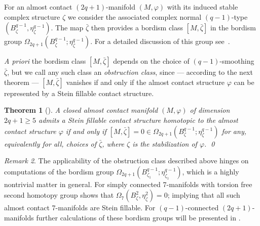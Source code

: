 \documentclass[12pt]{amsart}
\newcommand\acs{\varphi}  				%
\newcommand\scxs{\zeta}					%
\newcommand\bscxs{\bar \zeta}			%
\newtheorem{Theorem}{Theorem}[section]
\theoremstyle{remark}
\newtheorem{Remark}[Theorem]{Remark}
\begin{document}
For an almost contact $(2q{+}1)$-manifold $(M,\varphi )$ with its induced
stable complex structure $\zeta$ we consider the associated complex normal
$(q{-}1)$-type $(B^{q{-}1}_{\zeta}, \eta ^{q{-}1}_{\zeta})$.
The map $\bar \zeta$ then provides a bordism class $[M, \bar \zeta]$
in the bordism group $\Omega _{2q{+}1}(B^{q{-}1}_{\zeta}; \eta
^{q{-}1}_{\zeta})$. For a detailed discussion of this group
see~\cite{BCS2}. 


{\em A priori} the bordism class $[M, \bar \zeta ]$ depends on the
choice of $(q{-}1)$-smoothing $\bscxs$, but we call any such class 
an \emph{obstruction class},
since --- according to the next theorem --- $[M, \bscxs]$ vanishes 
if and only if the almost contact structure $\varphi$ can be
represented by a Stein fillable contact structure.


\begin{Theorem}[{\cite[Theorem~1.2]{BCS2}}] 
\label{thm:stein}
A closed almost contact manifold $(M, \acs)$ of dimension
$2q{+}1\geq5$ admits a Stein fillable contact structure homotopic to
the almost contact structure $\varphi$ if and only if $[M, \bscxs] = 0
\in \Omega_{2q{+}1}(B^{q{-}1}_\scxs; \eta^{q{-}1}_\scxs)$ for any,
equivalently for all, choices of $\bscxs$, where $\zeta $ is the stabilization
of $\varphi$. \qed
%
\end{Theorem}

\begin{Remark} \label{rem:applying_the_obstruction_class}
The applicability of the obstruction class described above hinges on computations of
the bordism group $\Omega_{2q{+}1}(B^{q{-}1}_{\zeta_1};
\eta^{q{-}1}_{\zeta_1})$, which is a highly nontrivial matter in
general. For simply connected 7-manifolds with torsion free second homotopy group
\cite[Theorem 1.3]{BCS2} shows that $\Omega_7(B^2_{\zeta},
\eta^2_{\zeta}) = 0$; implying that all such almost contact
7-manifolds are Stein fillable.  For $(q{-}1)$-connected
$(2q{+}1)$-manifolds further calculations of these bordism groups will be presented in
\cite{BCS3}.
\end{Remark}
\end{document}
